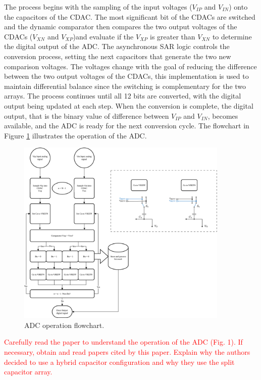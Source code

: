 The process begins with the sampling of the input voltages ($V_{IP}$ and $V_{IN}$) onto the capacitors of the CDAC. The most significant bit of the CDACs are switched and the dynamic comparator then compares the two output voltages of the CDACs ($V_{XN}$ and $V_{XP}$)and evaluate if the $V_{XP}$ is greater than $V_{XN}$ to determine the digital output of the ADC. 
The asynchronous SAR logic controls the conversion process, setting the next capacitors that generate the two new comparison voltages. The voltages change with the goal of reducing the difference between the two output voltages of the CDACs, this implementation is used to maintain differential balance since the switching is complementary for the two arrays.
The process continues until all 12 bits are converted, with the digital output being updated at each step. When the conversion is complete, the digital output, that is the binary value of difference between $V_{IP}$ and $V_{IN}$, becomes available, and the ADC is ready for the next conversion cycle. The flowchart in Figure \ref{fig:ADC-flowchart} illustrates the operation of the ADC.
\begin{figure}[H]
    \centering
    \includegraphics[width=0.9\textwidth]{Images/operation_ADC.png}
    \caption{ADC operation flowchart.}
    \label{fig:ADC-flowchart}
\end{figure}

\textcolor{red}{Carefully read the paper to understand the operation of the ADC (Fig. 1). If necessary, obtain and read papers cited by this paper. Explain why the authors decided to use a hybrid capacitor configuration and why they use the split capacitor array.}